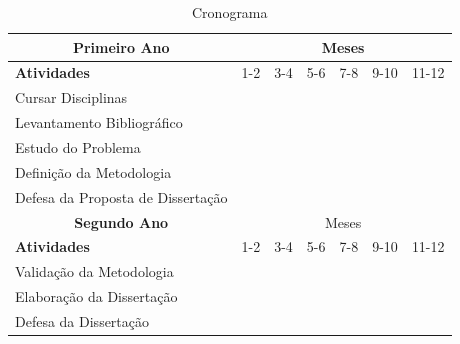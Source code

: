 \documentclass[12pt]{article}
\begin{document}
\begin{longtable}[c]{|l|l|l|l|l|l|l|}
\caption{Cronograma} \label{my-label}\\ \hline
\endfirsthead
\endhead
\multicolumn{1}{|c|}{\textbf{Primeiro Ano}} & \multicolumn{6}{c|}{\cellcolor[HTML]{ECF4FF}Meses} \\ \hline
\rowcolor[HTML]{ECF4FF} 
\textbf{Atividades} & 1-2 & 3-4 & 5-6 & 7-8 & 9-10 & 11-12 \\ \hline
Cursar Disciplinas & \cellcolor[HTML]{C0C0C0} & \cellcolor[HTML]{C0C0C0} & \cellcolor[HTML]{C0C0C0} & \cellcolor[HTML]{C0C0C0} & \cellcolor[HTML]{C0C0C0} & \cellcolor[HTML]{C0C0C0} \\ \hline
Levantamento Bibliográfico & \cellcolor[HTML]{C0C0C0} & & & & & \\ \hline
Estudo do Problema & & \cellcolor[HTML]{C0C0C0} & \cellcolor[HTML]{C0C0C0} & & & \\ \hline
Definição da Metodologia & & & & \cellcolor[HTML]{C0C0C0} & \cellcolor[HTML]{C0C0C0} & \\ \hline
Defesa da Proposta de Dissertação & & & & & \cellcolor[HTML]{C0C0C0} \\ \hline
\multicolumn{1}{|c|}{\textbf{Segundo Ano}}  & \multicolumn{6}{c|}{\cellcolor[HTML]{ECF4FF}Meses} \\ \hline \rowcolor[HTML]{ECF4FF} 
\textbf{Atividades} & 1-2 & 3-4 & 5-6 & 7-8 & 9-10 & 11-12 \\ \hline
Validação da Metodologia & \cellcolor[HTML]{C0C0C0} & \cellcolor[HTML]{C0C0C0} & \cellcolor[HTML]{C0C0C0} & & & \\ \hline
Elaboração da Dissertação & & & \cellcolor[HTML]{C0C0C0} & \cellcolor[HTML]{C0C0C0} & \cellcolor[HTML]{C0C0C0} & \\ \hline
Defesa da Dissertação & & & & & & \cellcolor[HTML]{C0C0C0} \\ \hline
\end{longtable}

\newpage


\end{document}

